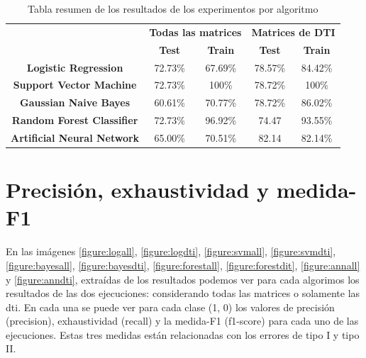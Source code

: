 \begin{table}[H]
\centering
\begin{tabular}{c|c|c|c|c|}
\cline{2-5}
                                        & \multicolumn{2}{c|}{\textbf{Todas las matrices}} & \multicolumn{2}{c|}{\textbf{Matrices de DTI}} \\ \cline{2-5} 
                                        & \textbf{Test}          & \textbf{Train}          & \textbf{Test}         & \textbf{Train}        \\ \hline
\multicolumn{1}{|c|}{\textbf{Logistic Regression}} & 72.73\%                & 67.69\%                 & 78.57\%               & 84.42\%               \\ \hline
\multicolumn{1}{|c|}{\textbf{Support Vector Machine}}      & 72.73\%                & 100\%                   & 78.72\%               & 100\%                 \\ \hline
\multicolumn{1}{|c|}{\textbf{Gaussian Naive Bayes}}    & 60.61\%                & 70.77\%                 & 78.72\%               & 86.02\%               \\ \hline
\multicolumn{1}{|c|}{\textbf{Random Forest Classifier}}   & 72.73\%                & 96.92\%                 & 74.47                 & 93.55\%               \\ \hline
\multicolumn{1}{|c|}{\textbf{Artificial Neural Network}}      & 65.00\%                & 70.51\%                 & 82.14                 & 82.14\%               \\ \hline
\end{tabular}
\caption{Tabla resumen de los resultados de los experimentos por algoritmo}
\label{table:resultados}

\end{table}

\section{Precisión,  exhaustividad y  medida-F1}

En las imágenes 
\ref{figure:logall}, 
\ref{figure:logdti}, 
\ref{figure:svmall}, 
\ref{figure:svmdti}, 
\ref{figure:bayesall}, 
\ref{figure:bayesdti},
\ref{figure:forestall},
\ref{figure:forestdit},
\ref{figure:annall} y
\ref{figure:anndti},
 extraídas de los resultados podemos ver para cada algorimos los resultados de las dos ejecuciones: considerando todas las matrices o solamente las \gls{dti}. En cada una se puede ver para cada clase (1, 0) los valores de precisión (precision), exhaustividad (recall) y la medida-F1 (f1-score) para cada uno de las ejecuciones. Estas tres medidas están relacionadas con los errores de tipo I y tipo II. 


